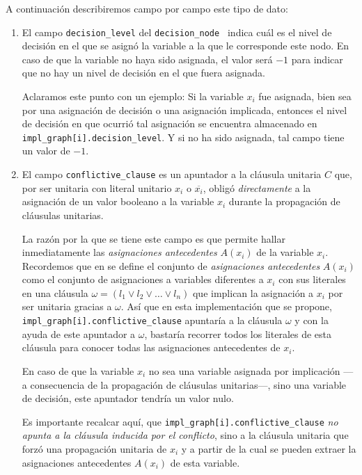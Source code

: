 \documentclass[12pt,lettersize,oneside]{article}
\begin{document}
A continuación describiremos campo por campo este tipo de dato:\vspace{-2.5mm}
\begin{enumerate}
\item El campo {\tt decision\_level} del {\tt decision\_node } indica cuál es el
  nivel de decisión en el que se asignó la variable a la que le corresponde este
  nodo. En caso de que la variable no haya sido asignada, el valor será $-1$
  para indicar que no hay un nivel de decisión en el que fuera asignada.

  Aclaramos este punto con un ejemplo: Si la variable $x_i$ fue asignada, bien
  sea por una asignación de decisión o una asignación implicada, entonces el
  nivel de decisión en que ocurrió tal asignación se encuentra almacenado en
  {\tt impl\_graph[i].decision\_level}. Y si no ha sido asignada, tal campo
  tiene un valor de $-1$.

\item El campo {\tt conflictive\_clause} es un apuntador a la cláusula unitaria
  $C$ que, por ser unitaria con literal unitario $x_i$ o $\overline{x_i}$,
  obligó \emph{directamente} a la asignación de un valor booleano a la variable
  $x_i$ durante la propagación de cláusulas unitarias.

  La razón por la que se tiene este campo es que permite hallar inmediatamente
  las \emph{asignaciones antecedentes} $A(x_i)$ de la variable $x_i$. Recordemos
  que en \cite{grasp96} se define el conjunto de \emph{asignaciones
    antecedentes} $A(x_i)$ como el conjunto de asignaciones a variables
  diferentes a $x_i$ con sus literales en una cláusula $\omega = (l_1 \vee l_2 \vee
  \ldots \vee l_n)$ que implican la asignación a $x_i$ por ser unitaria gracias a
  $\omega$. Así que en esta implementación que se propone, {\tt
    impl\_graph[i].conflictive\_clause} apuntaría a la cláusula $\omega$ y con
  la ayuda de este apuntador a $\omega$, bastaría recorrer todos los literales
  de esta cláusula para conocer todas las asignaciones antecedentes de $x_i$.

  En caso de que la variable $x_i$ no sea una variable asignada por implicación
  ---a consecuencia de la propagación de cláusulas unitarias---, sino una
  variable de decisión, este apuntador tendría un valor nulo.

  Es importante recalcar aquí, que {\tt impl\_graph[i].conflictive\_clause}
  \emph{no apunta a la cláusula inducida por el conflicto}, sino a la cláusula
  unitaria que forzó una propagación unitaria de $x_i$ y a partir de la cual se
  pueden extraer la asignaciones antecedentes $A(x_i)$ de esta variable.
\end{enumerate}
\end{document}
